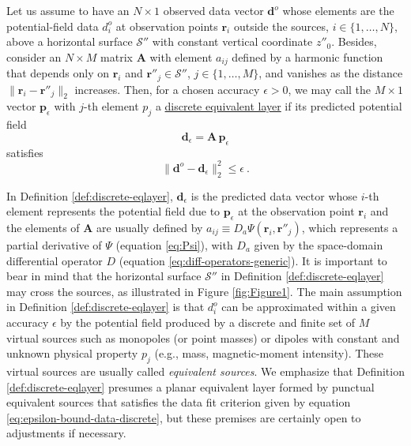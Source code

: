 \begin{definition}
	Let us assume to have an $N \times 1$ observed data vector $\mathbf{d}^{o}$ whose elements 
	are the potential-field data $d^{o}_{i}$ at observation points $\mathbf{r}_{i}$ outside the sources, 
	$i \in \{1, \dots, N\}$, above a horizontal surface $\mathcal{S}''$ with constant vertical 
	coordinate $z''_{0}$. Besides, consider an $N \times M$ 
	matrix $\mathbf{A}$ with element $a_{ij}$ defined by a harmonic function that depends only on $\mathbf{r}_{i}$ 
	and $\mathbf{r}''_{j} \in \mathcal{S}''$, $j \in \{1, \dots, M\}$, and
	vanishes as the distance $\| \mathbf{r}_{i} - \mathbf{r}''_{j} \|_{2}$ increases. 
	Then, for a chosen accuracy $\epsilon > 0$, we may call the $M \times 1$ vector $\mathbf{p}_{\epsilon}$ with $j$-th element $p_{j}$ 
	a \underline{discrete equivalent layer} if its predicted potential field 
	\begin{equation}
		\mathbf{d}_{\epsilon} = \mathbf{A} \, \mathbf{p}_{\epsilon}
		\label{eq:predicted-data-discrete-layer}
	\end{equation}
	satisfies 
	\begin{equation}
		\| \mathbf{d}^{o} - \mathbf{d}_{\epsilon} \|_{2}^{2} \le \epsilon \: .
		\label{eq:epsilon-bound-data-discrete}
	\end{equation}
	\label{def:discrete-eqlayer}
\end{definition}
In Definition \ref{def:discrete-eqlayer}, $\mathbf{d}_{\epsilon}$ is the predicted data vector whose 
$i$-th element represents the potential field due to $\mathbf{p}_{\epsilon}$ at the observation point $\mathbf{r}_{i}$ 
and the elements of $\mathbf{A}$ are usually defined by 
$a_{ij} \equiv D_{a} \Psi(\mathbf{r}_{i}, \mathbf{r}''_{j})$, which represents a 
partial derivative of $\Psi$ (equation \ref{eq:Psi}), with $D_{a}$ given by the space-domain differential operator 
$D$ (equation \ref{eq:diff-operators-generic}). 
It is important to bear in mind that the horizontal surface $\mathcal{S}''$ in Definition \ref{def:discrete-eqlayer} 
may cross the sources, as illustrated in Figure \ref{fig:Figure1}.
The main assumption in Definition \ref{def:discrete-eqlayer} is that $d^{o}_{i}$ can be approximated 
within a given accuracy $\epsilon$ by the potential field produced by a discrete and finite set of $M$ 
virtual sources such as monopoles (or point masses) or dipoles with 
constant and unknown physical property $p_{j}$ (e.g., mass, magnetic-moment intensity). 
These virtual sources are usually called \textit{equivalent sources}.
We emphasize that Definition \ref{def:discrete-eqlayer} presumes a planar equivalent layer formed 
by punctual equivalent sources that satisfies the data fit criterion given by equation \ref{eq:epsilon-bound-data-discrete}, 
but these premises are certainly open to adjustments if necessary.

